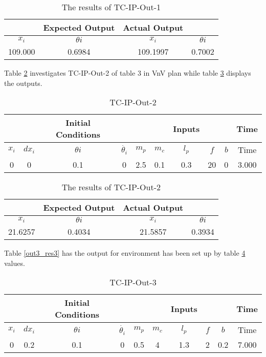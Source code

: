 \documentclass[12pt, titlepage]{article}
\begin{document}
\begin{table}[ht]
\caption{The results of TC-IP-Out-1} \label{out1_res}
\vspace*{2mm}
\centering
 \begin{tabular}{|c c|c c|} 
 \hline
&\textbf{Expected Output}& \textbf{Actual Output} &  \\ \hline
$x_i$&$\theta{i}$ & $x_i$&$\theta{i}$  \\ \hline
109.000 & 0.6984&109.1997&  0.7002 \\
 \hline
\end{tabular}
\end{table}	

Table \ref{out2} investigates TC-IP-Out-2 of table 3 in VnV plan while table \ref{out2_res2} displays the outputs.
\begin{table}[ht]
\caption{TC-IP-Out-2} \label{out2}
\vspace*{2mm}
\centering
 \begin{tabular}{|c c c c|c c c c c|c|} 
 \hline
&&\textbf{Initial Conditions}& &  &  &  \textbf{Inputs} &  &&\textbf{Time}  \\ \hline
$x_i$&$dx_i$&$\theta{i}$&$\dot{\theta_{i}}$ & $m_p$ & $m_c$ & $l_p$ & $f$ & $b$  & Time \\ \hline
0&0&0.1&0& 2.5 & 0.1& 0.3& 20 & 0 & 3.000\\
 \hline
\end{tabular}
\end{table}	

\begin{table}[ht]
\caption{The results of TC-IP-Out-2} \label{out2_res2}
\vspace*{2mm}
\centering
 \begin{tabular}{|c c|c c|} 
 \hline
&\textbf{Expected Output}& \textbf{Actual Output} &  \\ \hline
$x_i$&$\theta{i}$ & $x_i$&$\theta{i}$  \\ \hline
21.6257 & 0.4034 &21.5857 &  0.3934  \\
 \hline
\end{tabular}
\end{table}
Table \ref{out3_res3} has the output for environment has been set up by table \ref{out3} values.

\begin{table}[ht]
\caption{TC-IP-Out-3} \label{out3}
\vspace*{2mm}
\centering
 \begin{tabular}{|c c c c|c c c c c|c|} 
 \hline
&&\textbf{Initial Conditions}& &  &  &  \textbf{Inputs} &  &&\textbf{Time}  \\ \hline
$x_i$&$dx_i$&$\theta{i}$&$\dot{\theta_{i}}$ & $m_p$ & $m_c$ & $l_p$ & $f$ & $b$  & Time \\ \hline
0&0.2&0.1&0& 0.5 & 4& 1.3& 2 & 0.2 & 7.000\\
 \hline
\end{tabular}
\end{table}	
\end{document}
